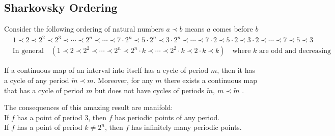 \subsection{Sharkovsky Ordering}
Consider the following ordering of natural numbers $a\prec b$ means $a$ comes before $b$
\begin{equation*}
	\begin{aligned}
		&1\prec2\prec2^2\prec2^3\prec\cdots\prec2^n\prec\cdots\prec7\cdot2^n\prec5\cdot2^n\prec3\cdot2^n\prec\cdots\prec7\cdot2\prec5\cdot2\prec3\cdot2\prec\cdots\prec7\prec5\prec3\\
		&\text{In general}\quad(1\prec2\prec2^2\prec\cdots\prec2^n\prec2^n\cdot k\prec\cdots\prec2^2\cdot k\prec2\cdot k\prec k)\quad\text{where $k$ are odd and decreasing}
	\end{aligned}
\end{equation*}
\begin{theorem}
	If a continuous map of an interval into itself has a cycle of period $m$, then it has a cycle of any period $\tilde{m}\prec m$.
	Moreover, for any $m$ there exists a continuous map that has a cycle of period $m$ but does not have cycles of periods $\tilde{m},\ m\prec\tilde{m}$ .
\end{theorem}
The consequences of this amazing result are manifold:\\
If $f$ has a point of period 3, then $f$ has periodic points of any period.\\
If $f$ has a point of period $k\neq2^n$, then $f$ has infinitely many periodic points.